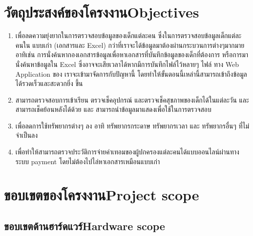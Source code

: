 \section{\ifcpe วัตถุประสงค์ของโครงงาน\else Objectives\fi}
\begin{enumerate}
    \item เพื่อลดความยุ่งยากในการตรวจสอบข้อมูลของเด็กแต่ละคน ซึ่งในการตรวจสอบข้อมูลเด็กแต่ละคนใน แบบเก่า (เอกสารและ Excel) กว่าที่เราจะได้ข้อมูลมาต้องผ่านกระบวนการต่างๆมากมาย อาทิเช่น การนั่งค้นหากองเอกสารข้อมูลเพื่อหาเอกสารที่บันทึกข้อมูลของเด็กที่ต้องการ หรือการมานั่งค้นหาข้อมูลใน Excel ซึ่งอาจจะเสียเวลาได้หากมีการบันทึกไฟล์ไว้หลายๆ ไฟล์ ทาง Web Application ของ เราจะเข้ามาจัดการกับปัญหานี้ โดยทําให้ขั้นตอนนี้เหล่านี้สามารถเข้าถึงข้อมูลได้รวดเร็วและสะดวกยิ่ง ขึ้น 

    \item สามารถตรวจสอบการเข้าเรียน ตรวจเช็คอุปกรณ์ และตรวจเช็คสุขภาพของเด็กได้ในแต่ละวัน และ  สามารถเช็คย้อนหลังได้ด้วย และ สามารถนําข้อมูลมาแสดงเพื่อใช้ในการตรวจสอบ

    \item เพื่อลดการใช้ทรัพยากรต่างๆ ลง อาทิ ทรัพยากรกระดาษ ทรัพยากรเวลา และ ทรัพยากรอื่นๆ ที่ไม่จําเป็นลง
    \item เพื่อทำให้สามารถตรวจประวัติการจ่ายค่าเทอมของผู้ปกครองแต่ละคนได้แบบออนไลน์ผ่านทางระบบ payment โดยไม่ต้องไปไล่หาเอกสารเหมือนแบบเก่า

\end{enumerate}


\section{\ifcpe ขอบเขตของโครงงาน\else Project scope\fi}

\subsection{\ifcpe ขอบเขตด้านฮาร์ดแวร์\else Hardware scope\fi}


